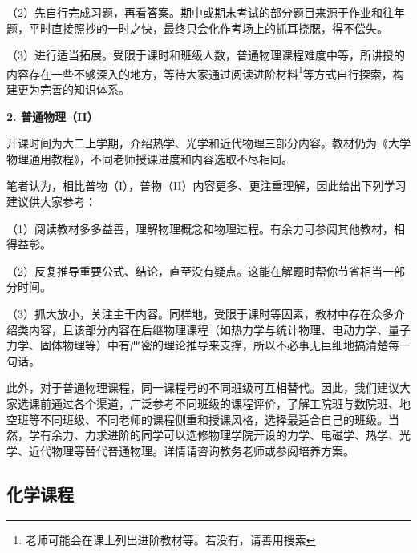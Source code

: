 \vspace{10pt}

（2）先自行完成习题，再看答案。期中或期末考试的部分题目来源于作业和往年题，平时直接照抄的一时之快，最终只会化作考场上的抓耳挠腮，得不偿失。

\vspace{10pt}

（3）进行适当拓展。受限于课时和班级人数，普通物理课程难度中等，所讲授的内容存在一些不够深入的地方，等待大家通过阅读进阶材料\footnote{老师可能会在课上列出进阶教材等。若没有，请善用搜索}等方式自行探索，构建更为完善的知识体系。

\vspace{10pt}

\textbf{2. 普通物理（II）}

开课时间为大二上学期，介绍热学、光学和近代物理三部分内容。教材仍为《大学物理通用教程》，不同老师授课进度和内容选取不尽相同。

\vspace{10pt}

笔者认为，相比普物（I），普物（II）内容更多、更注重理解，因此给出下列学习建议供大家参考：

\vspace{10pt}

（1）阅读教材多多益善，理解物理概念和物理过程。有余力可参阅其他教材，相得益彰。

\vspace{10pt}

（2）反复推导重要公式、结论，直至没有疑点。这能在解题时帮你节省相当一部分时间。

\vspace{10pt}

（3）抓大放小，关注主干内容。同样地，受限于课时等因素，教材中存在众多介绍类内容，且该部分内容在后继物理课程（如热力学与统计物理、电动力学、量子力学、固体物理等）中有严密的理论推导来支撑，所以不必事无巨细地搞清楚每一句话。

\vspace{10pt}

此外，对于普通物理课程，同一课程号的不同班级可互相替代。因此，我们建议大家选课前通过各个渠道，广泛参考不同班级的课程评价，了解工院班与数院班、地空班等不同班级、不同老师的课程侧重和授课风格，选择最适合自己的班级。当然，学有余力、力求进阶的同学可以选修物理学院开设的力学、电磁学、热学、光学、近代物理等替代普通物理。详情请咨询教务老师或参阅培养方案。

\subsection{化学课程}

